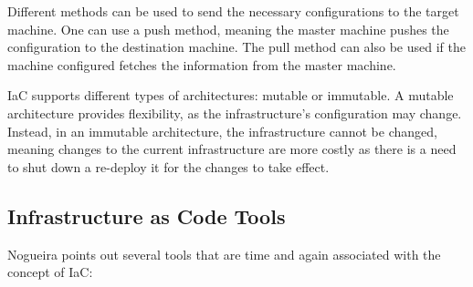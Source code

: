 Different methods can be used to send the necessary configurations to the target machine. One can use a push method, meaning the master machine pushes the configuration to the destination machine. The pull method can also be used if the machine configured fetches the information from the master machine.

IaC supports different types of architectures: mutable or immutable. A mutable architecture provides flexibility, as the infrastructure's configuration may change. Instead, in an immutable architecture, the infrastructure cannot be changed, meaning changes to the current infrastructure are more costly as there is a need to shut down a re-deploy it for the changes to take effect.


\subsection{Infrastructure as Code Tools} \label{sec:iac_tools}

Nogueira \cite{automating_open_source_up_ref} points out several tools that are time and again associated with the concept of IaC:

